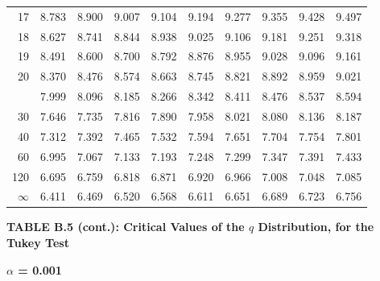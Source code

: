\documentclass[10pt]{article}
\begin{document}
\begin{longtable}{@{}r!{\vrule width 0.8pt\hspace{0.55em}}rrrrrrrrr@{}}
17 & 8.783 & 8.900 & 9.007 & 9.104 & 9.194 & 9.277 & 9.355 & 9.428 & 9.497 \\
18 & 8.627 & 8.741 & 8.844 & 8.938 & 9.025 & 9.106 & 9.181 & 9.251 & 9.318 \\
19 & 8.491 & 8.600 & 8.700 & 8.792 & 8.876 & 8.955 & 9.028 & 9.096 & 9.161 \\
20 & 8.370 & 8.476 & 8.574 & 8.663 & 8.745 & 8.821 & 8.892 & 8.959 & 9.021 \\
 & 7.999 & 8.096 & 8.185 & 8.266 & 8.342 & 8.411 & 8.476 & 8.537 & 8.594 \\
30 & 7.646 & 7.735 & 7.816 & 7.890 & 7.958 & 8.021 & 8.080 & 8.136 & 8.187 \\
40 & 7.312 & 7.392 & 7.465 & 7.532 & 7.594 & 7.651 & 7.704 & 7.754 & 7.801 \\
60 & 6.995 & 7.067 & 7.133 & 7.193 & 7.248 & 7.299 & 7.347 & 7.391 & 7.433 \\
120 & 6.695 & 6.759 & 6.818 & 6.871 & 6.920 & 6.966 & 7.008 & 7.048 & 7.085 \\
\addlinespace[0.30em]
$\infty$ & 6.411 & 6.469 & 6.520 & 6.568 & 6.611 & 6.651 & 6.689 & 6.723 & 6.756 \\
\end{longtable}
\newpage
\thispagestyle{empty}
\begin{center}
{\large\bfseries TABLE B.5 (cont.): Critical Values of the $q$ Distribution, for the Tukey Test\par}
\end{center}
{\large\bfseries $\alpha$ = 0.001\par}
\vspace{0.45em}
\small
\end{document}
